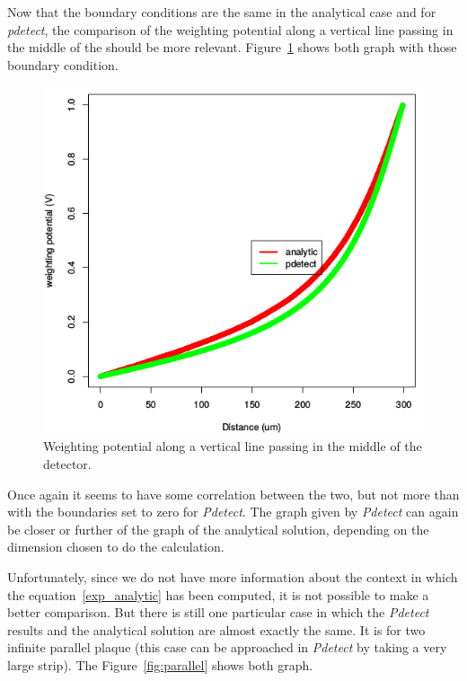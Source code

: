 \documentclass[11pt]{article}
\begin{document}
			Now that the boundary conditions are the same in the analytical case and for \textit{pdetect},
			the comparison of the weighting potential along a vertical line passing in the middle of the 
			should be more relevant. Figure~\ref{fig:semi_free_conditions} shows both graph with those boundary
			condition.

			\begin{figure}[H]
				\center
				\includegraphics[scale=0.45]{images/boundary_conditions/semi_free_conditions.png}
				\caption{Weighting potential along a vertical line passing in the middle of the detector.}
				\label{fig:semi_free_conditions}
			\end{figure}

			Once again it seems to have some correlation between the two, but not more than with the boundaries
			set to zero for \textit{Pdetect}. The graph given by \textit{Pdetect} can again be closer or further
			of the graph of the analytical solution, depending on the dimension chosen to do the calculation.

			Unfortunately, since we do not have more information about the context in which the equation~\ref{exp_analytic}
			has been computed, it is not possible to make a better comparison. But there is still one particular
			case in which the \textit{Pdetect} results and the analytical solution are almost exactly the same.
			It is for two infinite parallel plaque (this case can be approached in \textit{Pdetect} by taking
			a very large strip). The Figure~\ref{fig:parallel} shows both graph.
\end{document}
